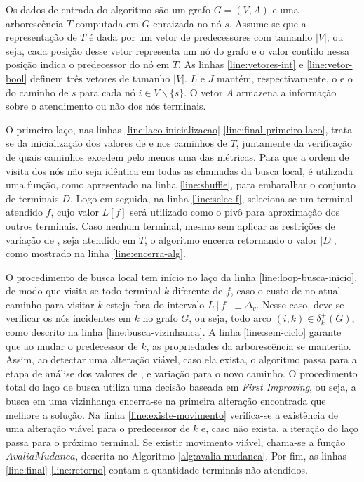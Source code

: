 Os dados de entrada  do algoritmo são um grafo $G = (V,  A)$ e uma arborescência
$T$ computada em $G$ enraizada no nó $s$. Assume-se que a representação de $T$ é
dada por  um vetor  de predecessores  com tamanho $|V|$,  ou seja,  cada posição
desse vetor representa um  nó do grafo e o valor contido  nessa posição indica o
predecessor   do    nó   em   $T$.   As    linhas   \eqref{line:vetores-int}   e
\eqref{line:vetor-bool} definem três vetores de tamanho $|V|$. $L$ e $J$ mantém,
respectivamente, o {\delay} e o {\jitter} do  caminho de $s$ para cada nó $i \in
V\backslash\{s\}$. O vetor $A$ armazena a  informação sobre o atendimento ou não
dos nós terminais.

O              primeiro               laço,              nas              linhas
\eqref{line:laco-inicializacao}-\eqref{line:final-primeiro-laco},   trata-se  da
inicialização  dos  valores  de  {\delay}  e  {\jitter}  nos  caminhos  de  $T$,
juntamente da verificação de quais caminhos excedem pelo menos uma das métricas.
Para que  a ordem de visita  dos nós não seja  idêntica em todas as  chamadas da
busca   local,   é   utilizada   uma   função,   como   apresentado   na   linha
\eqref{line:shuffle},  para embaralhar  o  conjunto de  terminais  $D$. Logo  em
seguida, na  linha \eqref{line:selec-f}, seleciona-se um  terminal atendido $f$,
cujo  valor $L[f]$  será  utilizado  como o  pivô  para  aproximação dos  outros
terminais. Caso nenhum terminal, mesmo sem  aplicar as restrições de variação de
{\delay}, seja  atendido em $T$, o  algoritmo encerra retornando o  valor $|D|$,
como mostrado na linha \eqref{line:encerra-alg}.

O   procedimento    de   busca   local    tem   início   no   laço    da   linha
\eqref{line:loop-busca-inicio},  de   modo  que  visita-se  todo   terminal  $k$
diferente de  $f$, caso o  custo de {\delay} no  atual caminho para  visitar $k$
esteja fora do  intervalo $L[f] \pm \Delta_v$. Nesse caso,  deve-se verificar os
nós  incidentes  em  $k$  no  grafo  $G$,   ou  seja,  todo  arco  $(i,  k)  \in
\delta_{k}^{+}(G)$,  como  descrito  na linha  \eqref{line:busca-vizinhanca}.  A
linha  \eqref{line:sem-ciclo} garante  que ao  mudar  o predecessor  de $k$,  as
propriedades  da arborescência  se manterão.  Assim, ao  detectar uma  alteração
viável, caso ela exista,  o algoritmo passa para a etapa  de análise dos valores
de {\delay}, {\jitter}  e variação para o novo caminho.  O procedimento total do
laço de busca utiliza  uma decisão baseada em {\em First  Improving}, ou seja, a
busca em uma vizinhança encerra-se  na primeira alteração encontrada que melhore
a solução.  Na linha  \eqref{line:existe-movimento} verifica-se a  existência de
uma alteração viável para o predecessor de $k$ e, caso não exista, a iteração do
laço passa  para o  próximo terminal.  Se existir  movimento viável,  chama-se a
função $AvaliaMudanca$, descrita no Algoritmo \ref{alg:avalia-mudanca}. Por fim,
as linhas \eqref{line:final}-\eqref{line:retorno}  contam a quantidade terminais
não atendidos.

